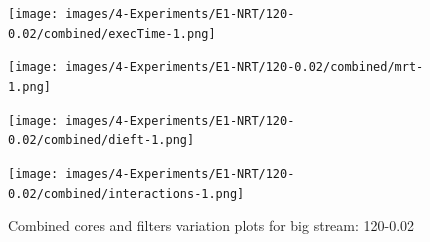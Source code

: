 \documentclass[12pt,a4paper]{article}
\begin{document}
\begin{figure}[H]
    \centering
    \hspace*{-3cm} %
    \begin{minipage}{0.5\textwidth}
        \centering
        \texttt{[image: images/4-Experiments/E1-NRT/120-0.02/combined/execTime-1.png]}
        \caption*{}
    \end{minipage}
    \hspace{0.16\textwidth}
    \begin{minipage}{0.5\textwidth}
        \centering
        \texttt{[image: images/4-Experiments/E1-NRT/120-0.02/combined/mrt-1.png]}
        \caption*{}
    \end{minipage}
    
    \vspace{0.5cm} %

    \hspace*{-3cm} %
    \begin{minipage}{0.5\textwidth}
        \centering
        \texttt{[image: images/4-Experiments/E1-NRT/120-0.02/combined/dieft-1.png]}
        \caption*{}
    \end{minipage}
    \hspace{0.16\textwidth}
    \begin{minipage}{0.5\textwidth}
        \centering
        \texttt{[image: images/4-Experiments/E1-NRT/120-0.02/combined/interactions-1.png]}
        \caption*{}
    \end{minipage}

    \caption{Combined cores and filters variation plots for big stream: 120-0.02}
    \label{img:exps-small-120-combined}
\end{figure}
\end{document}
